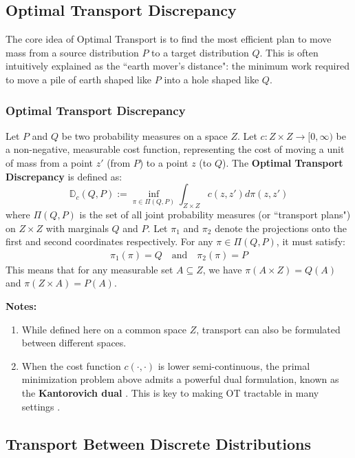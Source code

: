 \documentclass[12pt]{report}
\newcommand{\coloneqq}{\mathrel{:=}}
\begin{document}
\subsection{Optimal Transport Discrepancy}

The core idea of Optimal Transport is to find the most efficient plan to move mass from a source distribution $P$ to a target distribution $Q$. This is often intuitively explained as the ``earth mover's distance": the minimum work required to move a pile of earth shaped like $P$ into a hole shaped like $Q$.

\subsubsection*{Optimal Transport Discrepancy}
Let $P$ and $Q$ be two probability measures on a space $Z$. Let $c: Z \times Z \to [0, \infty)$ be a non-negative, measurable cost function, representing the cost of moving a unit of mass from a point $z'$ (from $P$) to a point $z$ (to $Q$). The \textbf{Optimal Transport Discrepancy} is defined as:
\[
\mathbb{D}_c(Q, P) \coloneqq \inf_{\pi \in \Pi(Q, P)} \int_{Z \times Z} c(z, z') d\pi(z, z')
\]
where $\Pi(Q, P)$ is the set of all joint probability measures (or ``transport plans") on $Z \times Z$ with marginals $Q$ and $P$. Let $\pi_1$ and $\pi_2$ denote the projections onto the first and second coordinates respectively. For any $\pi \in \Pi(Q, P)$, it must satisfy:
\begin{align*}
\pi_1(\pi) = Q \quad \text{and} \quad \pi_2(\pi) = P
\end{align*}
This means that for any measurable set $A \subseteq Z$, we have $\pi(A \times Z) = Q(A)$ and $\pi(Z \times A) = P(A)$.

\noindent\textbf{Notes:}
\begin{enumerate}
    \item While defined here on a common space $Z$, transport can also be formulated between different spaces.
    \item When the cost function $c(\cdot, \cdot)$ is lower semi-continuous, the primal minimization problem above admits a powerful dual formulation, known as the \textbf{Kantorovich dual} \citep{kantorovich2006translocation}. This is key to making OT tractable in many settings \citep{peyre2019computational}.
\end{enumerate}

\subsection{Transport Between Discrete Distributions}
\end{document}
